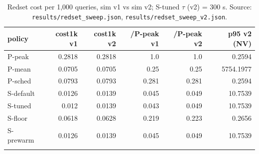 \begin{table}[htbp]
\centering
\footnotesize
\caption{Redset cost per 1,000 queries, sim v1 vs sim v2; S-tuned $\tau$ (v2) = 300 s. Source: \texttt{results/redset\_sweep.json}, \texttt{results/redset\_sweep\_v2.json}.}
\label{tab:redsetcost}
\setlength{\tabcolsep}{3pt}
\begin{tabular}{lrrrrr}
\toprule
\textbf{policy} & \textbf{cost1k v1} & \textbf{cost1k v2} & \textbf{/P-peak v1} & \textbf{/P-peak v2} & \textbf{p95 v2 (NV)} \\
\midrule
P-peak & 0.2818 & 0.2818 & 1.0 & 1.0 & 0.2594 \\
P-mean & 0.0705 & 0.0705 & 0.25 & 0.25 & 5754.1977 \\
P-sched & 0.0793 & 0.0793 & 0.281 & 0.281 & 0.2594 \\
S-default & 0.0126 & 0.0139 & 0.045 & 0.049 & 10.7539 \\
S-tuned & 0.012 & 0.0139 & 0.043 & 0.049 & 10.7539 \\
S-floor & 0.0618 & 0.0628 & 0.219 & 0.223 & 0.2656 \\
S-prewarm & 0.0126 & 0.0139 & 0.045 & 0.049 & 10.7539 \\
\botrule
\end{tabular}
\end{table}
